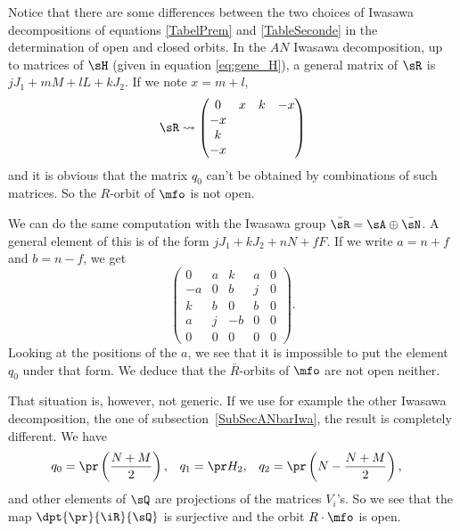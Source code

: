 Notice that there are some differences between the two choices of Iwasawa decompositions of equations \eqref{TabelPrem} and \eqref{TableSeconde} in the determination of open and closed orbits. In the $AN$ Iwasawa decomposition, up to matrices of $\sH$ (given in equation \eqref{eq:gene_H}), a general matrix of $\sR$ is $jJ_1+mM+lL+kJ_2$. If we note $x=m+l$,
\begin{equation} \label{eq:geneR}
	\sR\leadsto
	\begin{pmatrix}
		0 & x & k & -x \\
		-x             \\
		k              \\
		-x
	\end{pmatrix}
\end{equation}
and it is obvious that the matrix $q_0$ can't be obtained by combinations of such matrices. So the $R$-orbit of $\mfo$ is not open.

We can do the same computation with the Iwasawa group $\bar\sR=\sA\oplus\bar\sN$. A general element of this is of the form $jJ_1+kJ_2+nN+fF$. If we write $a=n+f$ and $b=n-f$, we get
\begin{equation}
	\begin{pmatrix}
		0  & a & k  & a & 0 \\
		-a & 0 & b  & j & 0 \\
		k  & b & 0  & b & 0 \\
		a  & j & -b & 0 & 0 \\
		0  & 0 & 0  & 0 & 0
	\end{pmatrix}.
\end{equation}
Looking at the positions of the $a$, we see that it is impossible to put the element $q_0$ under that form. We deduce that the $\bar R$-orbits of $\mfo$ are not open neither.

That situation is, however, not generic. If we use for example the other Iwasawa decomposition, the one of subsection~\ref{SubSecANbarIwa}, the result is completely different. We have
\begin{align}
	q_{0} & =\pr\left( \frac{ N+M }{ 2 } \right),
	      & q_{1}                                 & =\pr H_{2},
	      & q_{2}                                 & =\pr\left( N-\frac{ N+M }{ 2 } \right),
\end{align}
and other elements of $\sQ$ are projections of the matrices $V_{i}$'s.  So we see that the map $\dpt{\pr}{\iR}{\sQ}$ is surjective and \label{pg:mfo_ouvert} the orbit $R\cdot\mfo$ is open.

